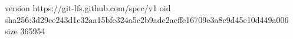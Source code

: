 version https://git-lfs.github.com/spec/v1
oid sha256:3d29ee243d1c32aa15bfe324a5c2b9ade2aeffe16709e3a8c9d45e10d449a006
size 365954
